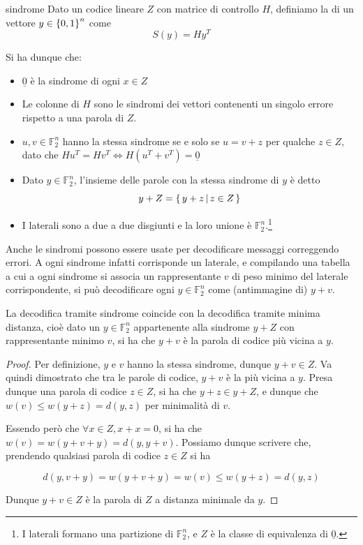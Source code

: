 \begin{definition}{sindrome}
  Dato un codice lineare \(Z\) con matrice di controllo \(H\), definiamo la  di un vettore \(y \in \set{0,1}^n\) come
  \[S(y) = H y^T\]
\end{definition}

Si ha dunque che:
\begin{itemize}
  \item \(\underline{0}\) è la sindrome di ogni \(x \in Z\)
  \item Le colonne di \(H\) sono le sindromi dei vettori contenenti un singolo errore rispetto a una parola di \(Z\).
  \item \(u,v \in \mathbb{F}_2^n\) hanno la stessa sindrome se e solo se \(u=v + z\) per qualche \(z \in Z\), dato che \(Hu^T=Hv^T \iff H(u^T+v^T) = \underline{0}\)
  \item Dato \(y \in \mathbb{F}_2^n\), l'insieme delle parole con la stessa sindrome di \(y\) è detto  \[y+Z = \set{y+z}[z \in Z]\]
  \item I laterali sono a due a due disgiunti e la loro unione è \(\mathbb{F}_2^n\).\footnote{I laterali formano una partizione di \(\mathbb{F}_2^n\), e \(Z\) è la classe di equivalenza di \(\underline{0}\).}
\end{itemize}

Anche le sindromi possono essere usate per decodificare messaggi correggendo errori.
A ogni sindrome infatti corrisponde un laterale, e compilando una tabella a cui a ogni sindrome si associa un rappresentante \(v\) di peso minimo del laterale corrispondente, si può decodificare ogni \(y \in \mathbb{F}_2^n\) come (antimmagine di) \(y + v\).

\begin{proposition}{}
  La decodifica tramite sindrome coincide con la decodifica tramite minima distanza, cioè dato un \(y\in \mathbb{F}_2^n\) appartenente alla sindrome \(y+Z\) con rappresentante minimo \(v\), 
  si ha che \(y+v\) è la parola di codice più vicina a \(y\).
\end{proposition}

\begin{proof}
  Per definizione, \(y\) e \(v\) hanno la stessa sindrome, dunque \(y+v \in Z\).
  Va quindi dimostrato che tra le parole di codice, \(y+v\) è la più vicina a \(y\).
  Presa dunque una parola di codice \(z \in Z\), si ha che \(y + z \in y + Z\), e dunque che \(w(v) \leq w(y + z) = d(y,z)\) per minimalità di \(v\).

  Essendo però che \(\forall x \in Z, x+x = 0\), si ha che \(w(v) = w(y+v+y)=d(y,y+v)\). Possiamo dunque scrivere che, prendendo qualsiasi parola di codice \(z \in Z\) si ha

  \[d(y,v+y) = w(y+v+y) = w(v) \leq w(y + z) = d(y,z)\]

  Dunque \(y+v \in Z\) è la parola di \(Z\) a distanza minimale da \(y\).
\end{proof}


